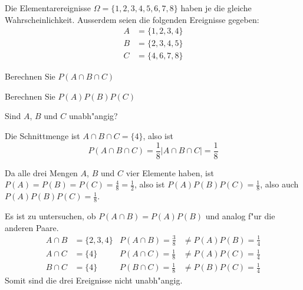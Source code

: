 Die Elementarereignisse $\Omega=\{1,2,3,4,5,6,7,8\}$ haben je die gleiche
Wahrscheinlichkeit. Ausserdem seien die folgenden Ereignisse gegeben:
\begin{align*}
A&=\{1,2,3,4\}\\
B&=\{2,3,4,5\}\\
C&=\{4,6,7,8\}
\end{align*}
\begin{teilaufgaben}
\item Berechnen Sie $P(A\cap B\cap C)$
\item Berechnen Sie $P(A)P(B)P(C)$
\item Sind $A$, $B$ und $C$ unabh"angig?
\end{teilaufgaben}

\begin{loesung}
\begin{teilaufgaben}
\item Die Schnittmenge ist $A\cap B\cap C=\{4\}$, also ist
\[
P(A\cap B\cap C)=\frac18|A\cap B\cap C|=\frac18
\]
\item Da alle drei Mengen $A$, $B$ und $C$ vier Elemente haben,
ist $P(A)=P(B)=P(C)=\frac{4}{8}=\frac12$, also ist
$P(A)P(B)P(C)=\frac18$, also auch $P(A)P(B)P(C)=\frac18$.
\item Es ist zu untersuchen, ob $P(A\cap B)=P(A)P(B)$ und analog f"ur
die anderen Paare.
\begin{align*}
A\cap B&=\{2,3,4\}&P(A\cap B)=\frac38&\ne P(A)P(B)=\frac14\\
A\cap C&=\{4\}&P(A\cap C)=\frac18&\ne P(A)P(C)=\frac14\\
B\cap C&=\{4\}&P(B\cap C)=\frac18&\ne P(B)P(C)=\frac14
\end{align*}
Somit sind die drei Ereignisse nicht unabh"angig.
\end{teilaufgaben}
\end{loesung}

